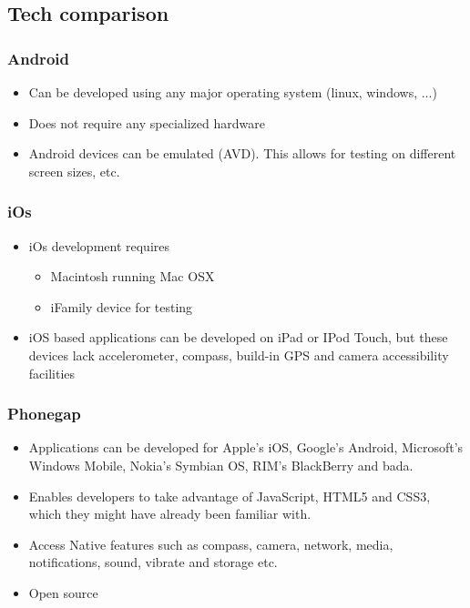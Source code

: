 \subsection{Tech comparison}

\subsubsection{Android}

	\begin{itemize}
		\item Can be developed using any major operating system (linux, windows, ...)
		\item Does not require any specialized hardware
		\item Android devices can be emulated (AVD). This allows for testing on
		different screen sizes, etc.
	\end{itemize}

\subsubsection{iOs}

	\begin{itemize}
		\item iOs development requires
			\begin{itemize}
				\item Macintosh running Mac OSX
				\item iFamily device for testing
			\end{itemize}
		\item iOS based applications can be developed on iPad or IPod Touch, but
		these devices lack accelerometer, compass, build-in GPS and camera
		accessibility facilities
	\end{itemize}

\subsubsection{Phonegap}

	\begin{itemize}
		\item Applications can be developed for Apple’s iOS, Google’s Android,
		Microsoft’s Windows Mobile, Nokia’s Symbian OS, RIM’s BlackBerry and bada.
		\item Enables developers to take advantage of JavaScript, HTML5 and CSS3,
		which they might have already been familiar with.
		\item Access Native features such as compass, camera, network, media,
		notifications, sound, vibrate and storage etc.
		\item Open source
	\end{itemize}
